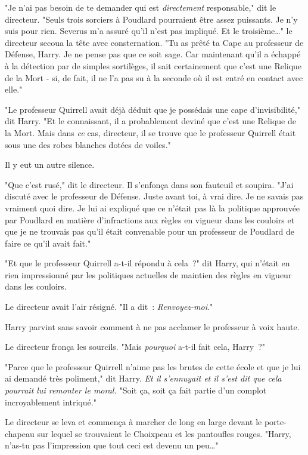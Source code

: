 "Je n'ai pas besoin de te demander qui est \emph{directement} responsable," dit le directeur. "Seuls trois sorciers à Poudlard pourraient être assez puissants. Je n'y suis pour rien. Severus m'a assuré qu'il n'est pas impliqué. Et le troisième…" le directeur secoua la tête avec consternation. "Tu as prêté ta Cape au professeur de Défense, Harry. Je ne pense pas que ce soit sage. Car maintenant qu'il a échappé à la détection par de simples sortilèges, il sait certainement que c'est une Relique de la Mort - si, de fait, il ne l'a pas su à la seconde où il est entré en contact avec elle."

"Le professeur Quirrell avait déjà déduit que je possédais une cape d'invisibilité," dit Harry. "Et le connaissant, il a probablement deviné que c'est une Relique de la Mort. Mais dans \emph{ce} cas, directeur, il se trouve que le professeur Quirrell était sous une des robes blanches dotées de voiles."

Il y eut un autre silence.

"Que c'est rusé," dit le directeur. Il s'enfonça dans son fauteuil et soupira. "J'ai discuté avec le professeur de Défense. Juste avant toi, à vrai dire. Je ne savais pas vraiment quoi dire. Je lui ai expliqué que ce n'était pas là la politique approuvée par Poudlard en matière d'infractions aux règles en vigueur dans les couloirs et que je ne trouvais pas qu'il était convenable pour un professeur de Poudlard de faire ce qu'il avait fait."

"Et que le professeur Quirrell a-t-il répondu à cela~?" dit Harry, qui n'était en rien impressionné par les politiques actuelles de maintien des règles en vigueur dans les couloirs.

Le directeur avait l'air résigné. "Il a dit~: \emph{Renvoyez-moi}."

Harry parvint sans savoir comment à ne pas acclamer le professeur à voix haute.

Le directeur fronça les sourcils. "Mais \emph{pourquoi} a-t-il fait cela, Harry~?"

"Parce que le professeur Quirrell n'aime pas les brutes de cette école et que je lui ai demandé très poliment," dit Harry. \emph{Et il s'ennuyait et il s'est dit que cela pourrait lui remonter le moral.} "Soit ça, soit ça fait partie d'un complot incroyablement intriqué."

Le directeur se leva et commença à marcher de long en large devant le porte-chapeau sur lequel se trouvaient le Choixpeau et les pantoufles rouges. "Harry, n'as-tu pas l'impression que tout ceci est devenu un peu…"

